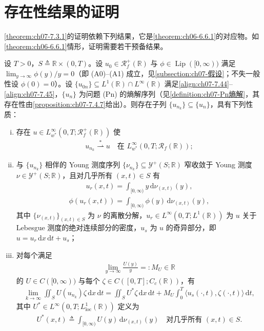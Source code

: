\documentclass[../../main.tex]{subfiles}%
\begin{document}
\section{存在性结果的证明}\label{section:ch07-存在性证明}

\cref{theorem:ch07-7.3.1}的证明依赖下列结果，它是\cref{theorem:ch06-6.6.1}的对应物。如\cref{theorem:ch06-6.6.1}情形，证明需要若干预备结果。

\begin{theorem}\label{theorem:ch07-7.5.1}
设 $T>0$，$S\triangleq\mathbb{R}\times(0,T)$。设 $u_0\in\mathscr{R}_f^+(\mathbb{R})$ 与 $\phi\in\operatorname{Lip}([0,\infty))$ 满足 $\lim_{y\to\infty}\phi(y)/y=0$（即 (A0)--(A1) 成立，见\cref{subsection:ch07-假设}；不失一般性设 $\phi(0)=0$）。设 $\{u_{0n}\}\subseteq L^1(\mathbb{R})\cap L^\infty(\mathbb{R})$ 满足\eqref{align:ch07-7.44}--\eqref{align:ch07-7.45}，$\{u_n\}$ 为问题 (Pn) 的熵解序列（见\cref{definition:ch07-Pn熵解}，其存在性由\cref{proposition:ch07-7.4.7}给出）。则存在子列 $\{u_{n_k}\}\subseteq\{u_n\}$，具有下列性质：
\begin{enumerate}[(i)]
\item 存在 $u\in L^\infty_{w^*}(0,T;\mathscr{R}_f^+(\mathbb{R}))$ 使
\begin{align}
u_{n_k}\stackrel{*}{\rightharpoonup}u\quad\text{在 }L^\infty_{w^*}(0,T;\mathscr{R}_f(\mathbb{R})); \label{align:ch07-7.88}
\end{align}
\item 与 $\{u_{n_k}\}$ 相伴的 Young 测度序列 $\{\nu_{n_k}\}\subseteq\mathcal{Y}^+(S;\mathbb{R})$ 窄收敛于 Young 测度 $\nu\in\mathcal{Y}^+(S;\mathbb{R})$，且对几乎所有 $(x,t)\in S$ 有
\begin{align}
u_r(x,t)=\int_{[0,\infty)}y\,\mathrm{d}\nu_{(x,t)}(y), \label{align:ch07-7.89}
\end{align}
\begin{align}
\phi(u_r(x,t))=\int_{[0,\infty)}\phi(y)\,\mathrm{d}\nu_{(x,t)}(y), \label{align:ch07-7.90}
\end{align}
其中 $\{\nu_{(x,t)}\}_{(x,t)\in S}$ 为 $\nu$ 的离散分解，$u_r\in L^\infty(0,T;L^1(\mathbb{R}))$ 为 $u$ 关于 Lebesgue 测度的绝对连续部分的密度，$u_s$ 为 $u$ 的奇异部分，即 $u=u_r\,\mathrm{d}x\,\mathrm{d}t+u_s$；
\item 对每个满足
\begin{align}
\lim_{y\to\infty}\frac{U(y)}{y}=:M_U\in\mathbb{R} \label{align:ch07-7.91}
\end{align}
的 $U\in C([0,\infty))$ 与每个 $\zeta\in C([0,T];C_c(\mathbb{R}))$，有
\begin{align}
\lim_{k\to\infty}\iint_S U(u_{n_k})\zeta\,\mathrm{d}x\,\mathrm{d}t
=\iint_S U^*\zeta\,\mathrm{d}x\,\mathrm{d}t+M_U\int_0^T\langle u_s(\cdot,t),\zeta(\cdot,t)\rangle\,\mathrm{d}t, \label{align:ch07-7.92}
\end{align}
其中 $U^*\in L^\infty(0,T;L^1_{\mathrm{loc}}(\mathbb{R}))$ 定义为
\begin{align}
U^*(x,t)\triangleq \int_{[0,\infty)}U(y)\,\mathrm{d}\nu_{(x,t)}(y)
\quad\text{对几乎所有 }(x,t)\in S. \label{align:ch07-7.93}
\end{align}
\end{enumerate}
\end{theorem}
\end{document}
